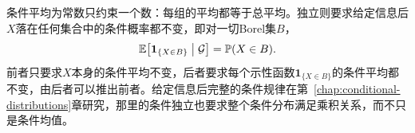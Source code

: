 条件平均为常数只约束一个数：每组的平均都等于总平均。独立则要求给定信息后$X$落在任何集合中的条件概率都不变，即对一切Borel集$B$，
\[
 \mathbb{E}\bigl[\mathbf{1}_{\{X\in B\}}\bigm|\mathcal{G}\bigr]=\mathbb{P}(X\in B).
\]
前者只要求$X$本身的条件平均不变，后者要求每个示性函数$\mathbf{1}_{\{X\in B\}}$的条件平均都不变，由后者可以推出前者。给定信息后完整的条件规律在第~\ref{chap:conditional-distributions}章研究，那里的条件独立也要求整个条件分布满足乘积关系，而不只是条件均值。
